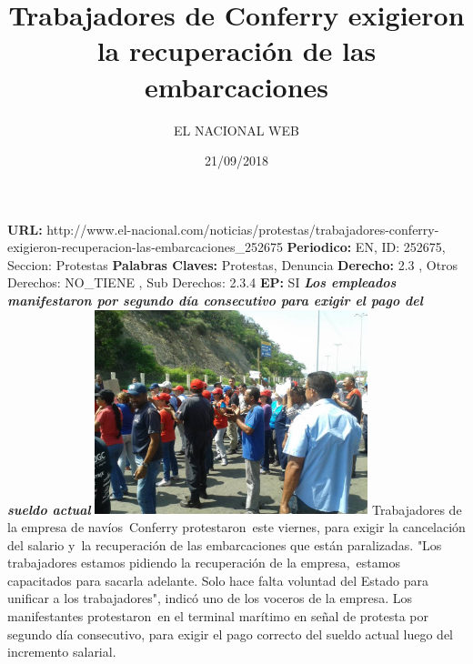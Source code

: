 \documentclass{article}%
\title{\textbf{Trabajadores de Conferry exigieron la recuperación de las embarcaciones}}%
\author{EL NACIONAL WEB}%
\date{21/09/2018}%
\begin{document}
%
\normalsize%
\maketitle%
\textbf{URL: }%
http://www.el{-}nacional.com/noticias/protestas/trabajadores{-}conferry{-}exigieron{-}recuperacion{-}las{-}embarcaciones\_252675\newline%
%
\textbf{Periodico: }%
EN, %
ID: %
252675, %
Seccion: %
Protestas\newline%
%
\textbf{Palabras Claves: }%
Protestas, Denuncia\newline%
%
\textbf{Derecho: }%
2.3%
, Otros Derechos: %
NO\_TIENE%
, Sub Derechos: %
2.3.4%
\newline%
%
\textbf{EP: }%
SI\newline%
\newline%
%
\textbf{\textit{Los empleados manifestaron por segundo día consecutivo para exigir el pago del sueldo actual}}%
\newline%
\newline%
%
\includegraphics[width=300px]{241.jpg}%
\newline%
%
Trabajadores de la empresa de navíos~Conferry protestaron~este viernes, para exigir la cancelación del salario y~la recuperación de las embarcaciones que están paralizadas.%
\newline%
%
"Los trabajadores estamos pidiendo la recuperación de la empresa,~estamos capacitados para sacarla adelante. Solo hace falta voluntad del Estado para unificar a los trabajadores", indicó uno de los voceros de la empresa.%
\newline%
%
Los manifestantes protestaron~en el terminal marítimo en señal de protesta por segundo día consecutivo, para exigir el pago correcto del sueldo actual luego del incremento salarial.%
\newline%
%
\end{document}
